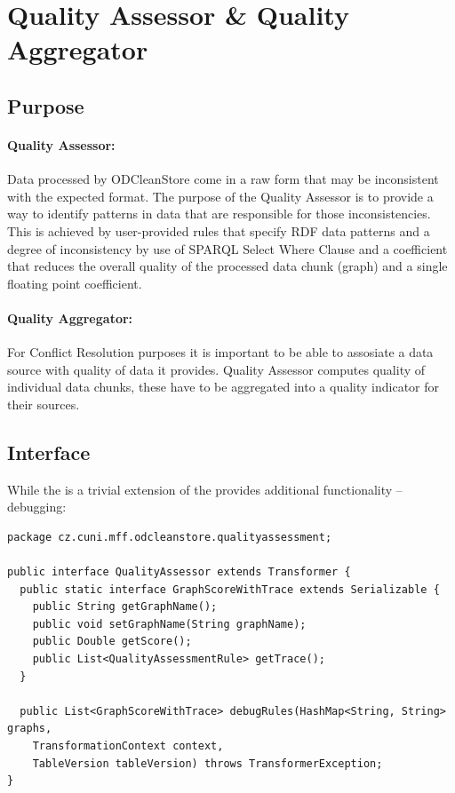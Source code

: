 \section{Quality Assessor \& Quality Aggregator}
\subsection{Purpose}

\paragraph{Quality Assessor:}
Data processed by ODCleanStore come in a raw form that may be inconsistent with the expected format. The purpose of the Quality Assessor is to provide a way to identify patterns in data that are responsible for those inconsistencies. This is achieved by user-provided rules that specify RDF data patterns and a degree of inconsistency by use of SPARQL Select Where Clause and a coefficient that reduces the overall quality of the processed data chunk (graph) and a single floating point coefficient.

\paragraph{Quality Aggregator:}
For Conflict Resolution purposes it is important to be able to assosiate a data source with quality of data it provides. Quality Assessor computes quality of individual data chunks, these have to be aggregated into a quality indicator for their sources.

\subsection{Interface}

While the  is a trivial extension of  the  provides additional functionality -- debugging:

\begin{lstlisting}[caption=Quality Assessor interface,label=lst:qualityAssessor]
package cz.cuni.mff.odcleanstore.qualityassessment;

public interface QualityAssessor extends Transformer {
  public static interface GraphScoreWithTrace extends Serializable {
    public String getGraphName();
    public void setGraphName(String graphName);
    public Double getScore();
    public List<QualityAssessmentRule> getTrace();
  }

  public List<GraphScoreWithTrace> debugRules(HashMap<String, String> graphs,
    TransformationContext context,
    TableVersion tableVersion) throws TransformerException;
}
\end{lstlisting}

